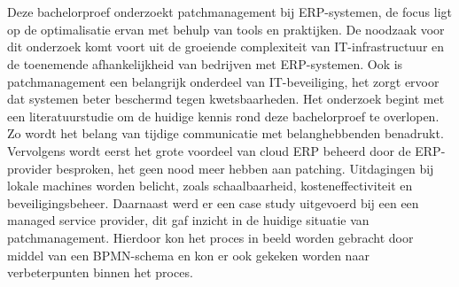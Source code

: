 
%
%
%
%
%

%



\chapter*{}


Deze bachelorproef onderzoekt patchmanagement bij ERP-systemen, de focus ligt op de optimalisatie ervan met behulp van tools en praktijken. De noodzaak voor dit onderzoek komt voort uit de groeiende complexiteit
van IT-infrastructuur en de toenemende afhankelijkheid van bedrijven met ERP-systemen. Ook is patchmanagement een belangrijk onderdeel van IT-beveiliging, het zorgt ervoor dat systemen beter beschermd tegen kwetsbaarheden.
Het onderzoek begint met een literatuurstudie om de huidige kennis rond deze bachelorproef te overlopen. Zo wordt het belang van tijdige communicatie met belanghebbenden benadrukt. Vervolgens wordt eerst het
grote voordeel van cloud ERP beheerd door de ERP-provider besproken, het geen nood meer hebben aan patching. Uitdagingen bij lokale machines worden belicht, zoals schaalbaarheid, kosteneffectiviteit en beveiligingsbeheer.
Daarnaast werd er een case study uitgevoerd bij een een managed service provider, dit gaf inzicht in de huidige situatie van patchmanagement. Hierdoor kon het proces in beeld worden gebracht door middel van een BPMN-schema en kon er ook gekeken worden naar verbeterpunten binnen het proces.

